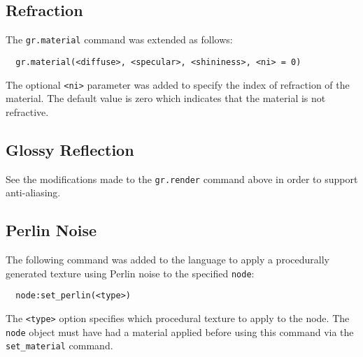 \subsection*{Refraction}
The \verb|gr.material| command was extended as follows:
\begin{verbatim}
  gr.material(<diffuse>, <specular>, <shininess>, <ni> = 0)
\end{verbatim}
The optional \verb|<ni>| parameter was added to specify the index of refraction
of the material. The default value is zero which indicates that the material is
not refractive.

\subsection*{Glossy Reflection}
See the modifications made to the \verb|gr.render| command above in order to
support anti-aliasing.

\subsection*{Perlin Noise}
The following command was added to the language to apply a procedurally
generated texture using Perlin noise to the specified \verb|node|:
\begin{verbatim}
  node:set_perlin(<type>)
\end{verbatim}
The \verb|<type>| option specifies which procedural texture to apply to the
node. The \verb|node| object must have had a material applied before using this
command via the \verb|set_material| command.

